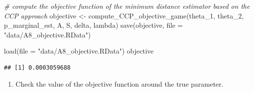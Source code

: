 \documentclass[
]{book}
\newenvironment{Shaded}{\begin{snugshade}}{\end{snugshade}}
\newcommand{\AttributeTok}[1]{\textcolor[rgb]{0.77,0.63,0.00}{#1}}
\newcommand{\CommentTok}[1]{\textcolor[rgb]{0.56,0.35,0.01}{\textit{#1}}}
\newcommand{\FunctionTok}[1]{\textcolor[rgb]{0.00,0.00,0.00}{#1}}
\newcommand{\NormalTok}[1]{#1}
\newcommand{\OtherTok}[1]{\textcolor[rgb]{0.56,0.35,0.01}{#1}}
\newcommand{\StringTok}[1]{\textcolor[rgb]{0.31,0.60,0.02}{#1}}
\providecommand{\tightlist}{%
  \setlength{\itemsep}{0pt}\setlength{\parskip}{0pt}}
\begin{document}
\begin{Shaded}
\begin{Highlighting}[]
\CommentTok{\# compute the objective function of the minimum distance estimator based on the CCP approach}
\NormalTok{objective }\OtherTok{\textless{}{-}} \FunctionTok{compute\_CCP\_objective\_game}\NormalTok{(theta\_1, theta\_2, p\_marginal\_est, A, S, delta, lambda)}
\FunctionTok{save}\NormalTok{(objective, }\AttributeTok{file =} \StringTok{"data/A8\_objective.RData"}\NormalTok{)}
\end{Highlighting}
\end{Shaded}

\begin{Shaded}
\begin{Highlighting}[]
\FunctionTok{load}\NormalTok{(}\AttributeTok{file =} \StringTok{"data/A8\_objective.RData"}\NormalTok{)}
\NormalTok{objective}
\end{Highlighting}
\end{Shaded}

\begin{verbatim}
## [1] 0.0003059688
\end{verbatim}

\begin{enumerate}
\def\labelenumi{\arabic{enumi}.}
\setcounter{enumi}{2}
\tightlist
\item
  Check the value of the objective function around the true parameter.
\end{enumerate}
\end{document}
